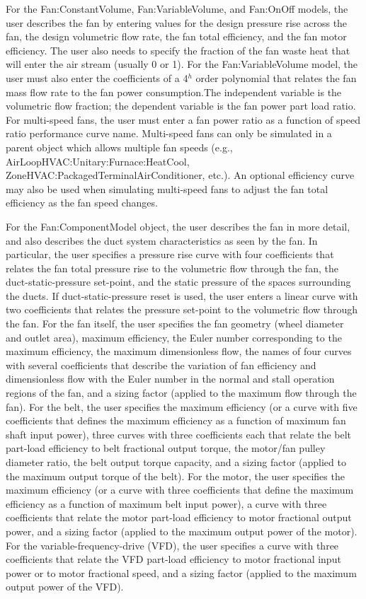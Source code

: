 For the Fan:ConstantVolume, Fan:VariableVolume, and Fan:OnOff models, the user describes the fan by entering values for the design pressure rise across the fan, the design volumetric flow rate, the fan total efficiency, and the fan motor efficiency. The user also needs to specify the fraction of the fan waste heat that will enter the air stream (usually 0 or 1). For the Fan:VariableVolume model, the user must also enter the coefficients of a 4\(^{h}\) order polynomial that relates the fan mass flow rate to the fan power consumption.The independent variable is the volumetric flow fraction; the dependent variable is the fan power part load ratio. For multi-speed fans, the user must enter a fan power ratio as a function of speed ratio performance curve name. Multi-speed fans can only be simulated in a parent object which allows multiple fan speeds (e.g., AirLoopHVAC:Unitary:Furnace:HeatCool, ZoneHVAC:PackagedTerminalAirConditioner, etc.). An optional efficiency curve may also be used when simulating multi-speed fans to adjust the fan total efficiency as the fan speed changes.

For the Fan:ComponentModel object, the user describes the fan in more detail, and also describes the duct system characteristics as seen by the fan. In particular, the user specifies a pressure rise curve with four coefficients that relates the fan total pressure rise to the volumetric flow through the fan, the duct-static-pressure set-point, and the static pressure of the spaces surrounding the ducts. If duct-static-pressure reset is used, the user enters a linear curve with two coefficients that relates the pressure set-point to the volumetric flow through the fan. For the fan itself, the user specifies the fan geometry (wheel diameter and outlet area), maximum efficiency, the Euler number corresponding to the maximum efficiency, the maximum dimensionless flow, the names of four curves with several coefficients that describe the variation of fan efficiency and dimensionless flow with the Euler number in the normal and stall operation regions of the fan, and a sizing factor (applied to the maximum flow through the fan). For the belt, the user specifies the maximum efficiency (or a curve with five coefficients that defines the maximum efficiency as a function of maximum fan shaft input power), three curves with three coefficients each that relate the belt part-load efficiency to belt fractional output torque, the motor/fan pulley diameter ratio, the belt output torque capacity, and a sizing factor (applied to the maximum output torque of the belt). For the motor, the user specifies the maximum efficiency (or a curve with three coefficients that define the maximum efficiency as a function of maximum belt input power), a curve with three coefficients that relate the motor part-load efficiency to motor fractional output power, and a sizing factor (applied to the maximum output power of the motor). For the variable-frequency-drive (VFD), the user specifies a curve with three coefficients that relate the VFD part-load efficiency to motor fractional input power or to motor fractional speed, and a sizing factor (applied to the maximum output power of the VFD).

